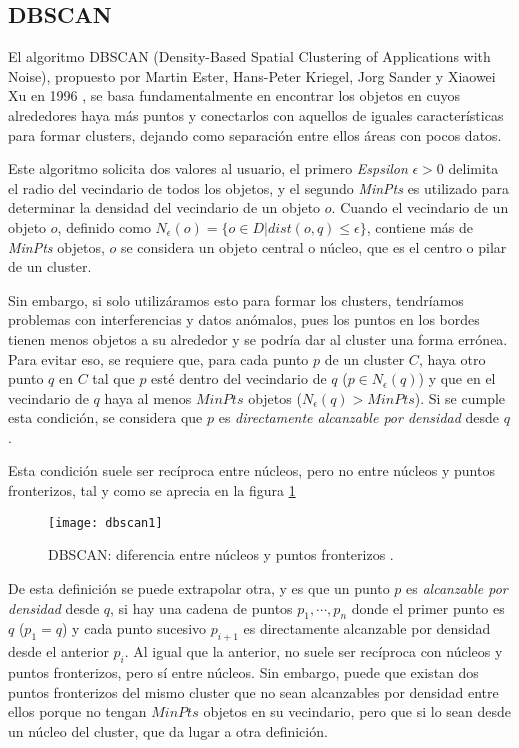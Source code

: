 \documentclass[10pt, a4paper]{article}
\begin{document}


\subsection{\textbf{DBSCAN}} \label{subsec:dbscan}


El algoritmo DBSCAN (Density-Based Spatial Clustering of Applications with Noise), propuesto por Martin Ester, Hans-Peter Kriegel, Jorg Sander y Xiaowei Xu en 1996 \cite{DBSCAN}, se basa fundamentalmente en encontrar los objetos en cuyos alrededores haya más puntos y conectarlos con aquellos de iguales características para formar clusters, dejando como separación entre ellos áreas con pocos datos.

Este algoritmo solicita dos valores al usuario, el primero \textit{Espsilon} $\epsilon > 0$ delimita el radio del vecindario de todos los objetos, y el segundo \textit{MinPts} es utilizado para determinar la densidad del vecindario de un objeto $o$. Cuando el vecindario de un objeto $o$, definido como $N_{\epsilon}(o) = \{o \in D | dist(o,q) \leq \epsilon\}$, contiene más de \textit{MinPts} objetos, $o$ se considera un objeto central o núcleo, que es el centro o pilar de un cluster.

Sin embargo, si solo utilizáramos esto para formar los clusters, tendríamos problemas con interferencias y datos anómalos, pues los puntos en los bordes tienen menos objetos a su alrededor y se podría dar al cluster una forma errónea. Para evitar eso, se requiere que, para cada punto $p$ de un cluster $C$, haya otro punto $q$ en $C$ tal que $p$ esté dentro del vecindario de $q$ ($p  \in N_{\epsilon}(q)$) y que en el vecindario de $q$ haya al menos $MinPts$ objetos ($N_{\epsilon}(q) > MinPts$). Si se cumple esta condición, se considera que $p$ es \textit{directamente alcanzable por densidad} desde $q$.

Esta condición suele ser recíproca entre núcleos, pero no entre núcleos y puntos fronterizos, tal y como se aprecia en la figura \ref{fig:dbscan1}

\begin{figure}[ht]
\centering
\texttt{[image: dbscan1]}
\caption{DBSCAN: diferencia entre núcleos y puntos fronterizos \cite{DBSCAN}.}
\label{fig:dbscan1}
\end{figure}

De esta definición se puede extrapolar otra, y es que un punto $p$ es \textit{alcanzable por densidad} desde $q$, si hay una cadena de puntos $p_1, \cdots, p_n$ donde el primer punto es $q$ ($p_1 = q$) y cada punto sucesivo $p_{i+1}$ es directamente alcanzable por densidad desde el anterior $p_i$. Al igual que la anterior, no suele ser recíproca con núcleos y puntos fronterizos, pero sí entre núcleos. Sin embargo, puede que existan dos puntos fronterizos del mismo cluster que no sean alcanzables por densidad entre ellos porque no tengan $MinPts$ objetos en su vecindario, pero que si lo sean desde un núcleo del cluster, que da lugar a otra definición.
 
\end{document}
